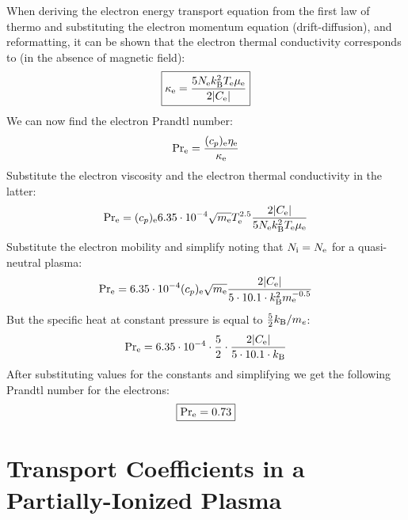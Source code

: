 \documentclass{warpdoc}
\newcommand\frameeqn[1]{\fbox{$\displaystyle #1$}}
\begin{document}
When deriving the electron energy transport equation from the first law of thermo and substituting the electron momentum equation (drift-diffusion), and reformatting, it can be shown that the electron thermal conductivity corresponds to (in the absence of magnetic field):
%
\begin{equation}
\frameeqn{
 \kappa_{\rm e}=\frac{5 N_{\rm e} k_{\rm B}^2 T_{\rm e} \mu_{\rm e}}{2|C_{\rm e}|}
}
\end{equation}
%
We can now find the electron Prandtl number:
%
\begin{equation}
 {\rm Pr_e} = \frac{(c_p)_{\rm e} \eta_{\rm e}}{\kappa_{\rm e}}
\end{equation}
%
Substitute the electron viscosity and the electron thermal conductivity in the latter:
%
\begin{equation}
 {\rm Pr_e} = (c_p)_{\rm e}  6.35 \cdot 10^{-4}  \sqrt{m_{\rm e}}   T_{\rm e}^{2.5} \frac{2|C_{\rm e}|}{5 N_{\rm e} k_{\rm B}^2 T_{\rm e} \mu_{\rm e}}
\end{equation}
%
Substitute the electron mobility and simplify noting that $N_{\rm i} = N_{\rm e}$ for a quasi-neutral plasma:
%
\begin{equation}
 {\rm Pr_e} = 6.35 \cdot 10^{-4} (c_p)_{\rm e}    \sqrt{m_{\rm e}}    \frac{2|C_{\rm e}|}{5\cdot 10.1\cdot  k_{\rm B}^2   m_{\rm e}^{-0.5}  }
\end{equation}
%
But the specific heat at constant pressure is equal to $\frac{5}{2}k_{\rm B}/m_e$:
%
\begin{equation}
 {\rm Pr_e} = 6.35 \cdot 10^{-4} \cdot \frac{5}{2}  \cdot      \frac{2|C_{\rm e}|}{5\cdot 10.1\cdot  k_{\rm B}    }
\end{equation}
%
After substituting values for the constants and simplifying we get the following Prandtl number for the electrons:
%
\begin{equation}
\frameeqn{
 {\rm Pr_e} = 0.73
}
\end{equation}
%


\section{Transport Coefficients in a Partially-Ionized Plasma}
\end{document}
